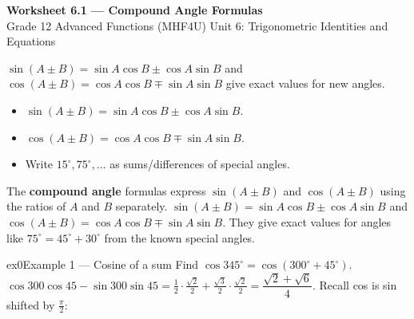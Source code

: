 \documentclass[11pt]{article}
\begin{document}
\begin{center}
{\LARGE\bfseries\color{titleblue}Worksheet 6.1 --- Compound Angle Formulas}\\[2pt]
{\small Grade 12 Advanced Functions (MHF4U) \textperiodcentered{} Unit 6: Trigonometric Identities and Equations}
\end{center}

\begin{ideabox}
$\sin(A\pm B)=\sin A\cos B\pm\cos A\sin B$ and $\cos(A\pm B)=\cos A\cos B\mp\sin A\sin B$ give exact values for new angles.
\begin{itemize}[leftmargin=*,itemsep=2pt]
  \item $\sin(A\pm B)=\sin A\cos B\pm\cos A\sin B$.
  \item $\cos(A\pm B)=\cos A\cos B\mp\sin A\sin B$.
  \item Write $15^\circ,75^\circ,\dots$ as sums/differences of special angles.
\end{itemize}
\end{ideabox}

\begin{learnbox}
The \textbf{compound angle} formulas express $\sin(A\pm B)$ and $\cos(A\pm B)$ using the ratios of $A$ and $B$ separately.
$\sin(A\pm B)=\sin A\cos B\pm\cos A\sin B$ and $\cos(A\pm B)=\cos A\cos B\mp\sin A\sin B$.
They give exact values for angles like $75^\circ=45^\circ+30^\circ$ from the known special angles.
\end{learnbox}


\begin{example}{ex0}{Example 1 --- Cosine of a sum}
Find $\cos 345^\circ=\cos(300^\circ+45^\circ)$.\soln $\cos300\cos45-\sin300\sin45=\tfrac12\cdot\tfrac{\sqrt2}{2}+\tfrac{\sqrt3}{2}\cdot\tfrac{\sqrt2}{2}=\dfrac{\sqrt2+\sqrt6}{4}$. Recall cos is sin shifted by $\tfrac{\pi}{2}$:\begin{center}\end{center}
\end{example}
\end{document}
